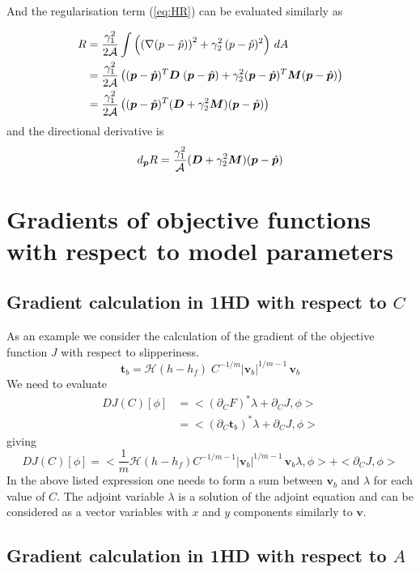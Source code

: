 \documentclass[10pt,a4paper]{book}
\newcommand{\He}{\mathcal{H}}
\newcommand{\p}{\partial}
\begin{document}
And the regularisation term (\ref{eq:HR}) can be evaluated similarly as

\begin{align*}
R 
&= \frac{\gamma_1^2}{2\cal{A}} \int \left (  \left ( \nabla( p - \hat{p}) \right )^2 + \gamma_2^2 \, (p-\hat{p})^2 \right ) \, dA \\
&= \frac{\gamma_1^2}{2\cal{A}} \left (  (\bm{p}-\hat{\bm{p}})^T \bm{D} \; (\bm{p} - \hat{\bm{p}}) + \gamma_2^2 (\bm{p}-\hat{\bm{p}})^T \bm{M} (\bm{p} - \hat{\bm{p}}) \right )\\
&= \frac{\gamma_1^2}{2\cal{A}} \left (  (\bm{p}-\hat{\bm{p}})^T (\bm{D} + \gamma_2^2 \bm{M}) (\bm{p} - \hat{\bm{p}}) \right )
\end{align*}
and the directional derivative is
\[
d_{\bm{p}} R =\frac{\gamma_1^2}{\cal{A}} (\bm{D}+\gamma_2^2 \bm{M}) (\bm{p}-\hat{\bm{p}})
\]





\section{Gradients of objective functions with respect to model parameters}

\subsection{Gradient calculation in 1HD with respect to $C$}

As an example we consider the calculation of the gradient of the
objective function $J$ with respect to slipperiness.
\[
\bm{t}_b   = \He(h-h_f) \; C^{-1/m} | \bm{v}_b|^{1/m-1} \, \bm{v}_b 
\]
We need to evaluate 
\begin{align*}
 D J(C)[\phi] &= < (\p_C F)^\ast \lambda  + \p_C J ,  \phi >  \\
              &= < (\p_C \bm{t}_b)^\ast \lambda  + \p_C J ,  \phi > 
\end{align*}
giving
\[
D J(C)[\phi]=< \frac{1}{m} \He(h-h_f) C^{-1/m-1} | \bm{v}_b|^{1/m-1} \, \bm{v}_b   \lambda  , \phi > +  < \p_C J ,  \phi > 
\]
In the above listed expression one needs to form a sum between
$\bm{v}_b$ and $\lambda$ for each value of $C$. The adjoint variable
$\lambda$ is a solution of the adjoint equation and can be considered
as a vector variables with $x$ and $y$ components similarly to
$\bm{v}$.

\subsection{Gradient calculation in 1HD with respect to $A$}
\end{document}
